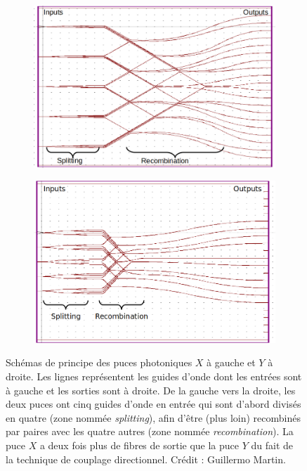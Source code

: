 \begin{figure}[ht!]
    \centering
    \begin{subfigure}{0.5\textwidth}
        \centering
        \includegraphics[width=\textwidth]{Figure_Chap2/5TC_X_ChipScheme_rot_l_01.png}
    \end{subfigure}%
    \begin{subfigure}{0.5\textwidth}
        \centering
        \includegraphics[width=\textwidth]{Figure_Chap2/5TC_Y_ChipScheme_rot_l_02.png}
    \end{subfigure}
    \caption[Schémas de principe des puces photoniques $X$ et $Y$.]{Schémas de principe des puces photoniques $X$ à gauche et $Y$ à droite. Les lignes représentent les guides d'onde dont les entrées sont à gauche et les sorties sont à droite. De la gauche vers la droite, les deux puces ont cinq guides d'onde en entrée qui sont d'abord divisés en quatre (zone nommée \textit{splitting}), afin d'être (plus loin) recombinés par paires avec les quatre autres (zone nommée \textit{recombination}). La puce $X$ a deux fois plus de fibres de sortie que la puce $Y$ du fait de la technique de couplage directionnel. Crédit : Guillermo Martin.}
    \label{fig:ChipSchemes}
\end{figure}


